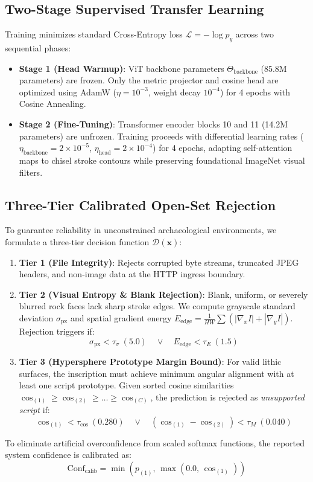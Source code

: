 \documentclass[conference,10pt]{IEEEtran}
\begin{document}
\subsection{Two-Stage Supervised Transfer Learning}
Training minimizes standard Cross-Entropy loss $\mathcal{L} = -\log p_y$ across two sequential phases:
\begin{itemize}
    \item \textbf{Stage 1 (Head Warmup)}: ViT backbone parameters $\Theta_{\text{backbone}}$ (85.8M parameters) are frozen. Only the metric projector and cosine head are optimized using AdamW ($\eta = 10^{-3}$, weight decay $10^{-4}$) for 4 epochs with Cosine Annealing.
    \item \textbf{Stage 2 (Fine-Tuning)}: Transformer encoder blocks 10 and 11 (14.2M parameters) are unfrozen. Training proceeds with differential learning rates ($\eta_{\text{backbone}} = 2 \times 10^{-5}$, $\eta_{\text{head}} = 2 \times 10^{-4}$) for 4 epochs, adapting self-attention maps to chisel stroke contours while preserving foundational ImageNet visual filters.
\end{itemize}

\subsection{Three-Tier Calibrated Open-Set Rejection}
To guarantee reliability in unconstrained archaeological environments, we formulate a three-tier decision function $\mathcal{D}(\mathbf{x})$:
\begin{enumerate}
    \item \textbf{Tier 1 (File Integrity)}: Rejects corrupted byte streams, truncated JPEG headers, and non-image data at the HTTP ingress boundary.
    \item \textbf{Tier 2 (Visual Entropy \& Blank Rejection)}: Blank, uniform, or severely blurred rock faces lack sharp stroke edges. We compute grayscale standard deviation $\sigma_{\text{px}}$ and spatial gradient energy $E_{\text{edge}} = \frac{1}{HW} \sum (|\nabla_x I| + |\nabla_y I|)$. Rejection triggers if:
    \begin{equation}
    \sigma_{\text{px}} < \tau_{\sigma} \ (5.0) \quad \lor \quad E_{\text{edge}} < \tau_E \ (1.5)
    \end{equation}
    \item \textbf{Tier 3 (Hypersphere Prototype Margin Bound)}: For valid lithic surfaces, the inscription must achieve minimum angular alignment with at least one script prototype. Given sorted cosine similarities $\cos_{(1)} \ge \cos_{(2)} \ge \dots \ge \cos_{(C)}$, the prediction is rejected as \textit{unsupported script} if:
    \begin{equation}
    \cos_{(1)} < \tau_{\text{cos}} \ (0.280) \quad \lor \quad (\cos_{(1)} - \cos_{(2)}) < \tau_M \ (0.040)
    \end{equation}
\end{enumerate}
To eliminate artificial overconfidence from scaled softmax functions, the reported system confidence is calibrated as:
\begin{equation}
\text{Conf}_{\text{calib}} = \min\left(p_{(1)}, \, \max(0.0, \, \cos_{(1)})\right)
\end{equation}
\end{document}
